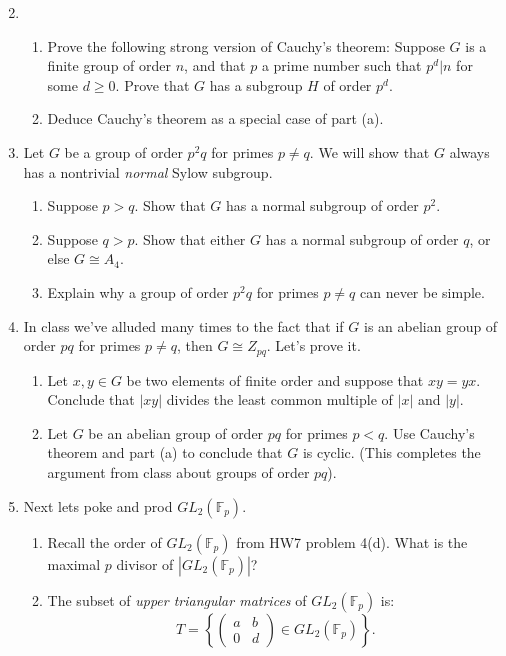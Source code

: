 \documentclass[11pt]{article}
\newcommand{\bF}{\mathbb{F}}
\begin{document}
\begin{enumerate}
  \setcounter{enumi}{1}
  \item{
  \begin{enumerate}
    \item Prove the following strong version of Cauchy's theorem:  Suppose $G$ is a finite group of order $n$, and that $p$ a prime number such that $p^d|n$ for some $d\ge0$.  Prove that $G$ has a subgroup $H$ of order $p^d$.
    \item Deduce Cauchy's theorem as a special case of part (a).
  \end{enumerate}
  }
  \item{
  Let $G$ be a group of order $p^2q$ for primes $p\not=q$.  We will show that $G$ always has a nontrivial \textit{normal} Sylow subgroup.
  \begin{enumerate}
    \item Suppose $p>q$.  Show that $G$ has a normal subgroup of order $p^2$.
    \item Suppose $q>p$.  Show that either $G$ has a normal subgroup of order $q$, or else $G\cong A_4$.
    \item Explain why a group of order $p^2q$ for primes $p\not=q$ can never be simple.
  \end{enumerate}
  }
  \item{In class we've alluded many times to the fact that if $G$ is an abelian group of order $pq$ for primes $p\not=q$, then $G\cong Z_{pq}$.  Let's prove it.
  \begin{enumerate}
    \item{
    Let $x,y\in G$ be two elements of finite order and suppose that $xy=yx$.  Conclude that $|xy|$ divides the least common multiple of $|x|$ and $|y|$.
    }
    \item{
    Let $G$ be an abelian group of order $pq$ for primes $p<q$.  Use Cauchy's theorem and part (a) to conclude that $G$ is cyclic.  (This completes the argument from class about groups of order $pq$).
    }
  \end{enumerate}
  }
  \item{
  Next lets poke and prod $GL_2(\bF_p)$.
  \begin{enumerate}
    \item{
    Recall the order of $GL_2(\bF_p)$ from HW7 problem 4(d).  What is the maximal $p$ divisor of $|GL_2(\bF_p)|$?
    }
    \item{
    The subset of \textit{upper triangular matrices} of $GL_2(\bF_p)$ is:
    \[T = \left\{\begin{pmatrix}a & b\\0 & d\end{pmatrix}\in GL_2(\bF_p)\right\}.\]
}
\end{enumerate}}
\end{enumerate}
\end{document}
